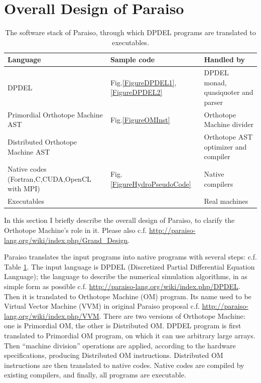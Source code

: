 \documentclass[twocolumn]{article}
\begin{document}
\section{Overall Design of Paraiso}
\label{SectionParaiso}

\begin{table}
  \begin{tabular}{|l|l|l|}
    \hline 
    Language                             &  Sample code & Handled by \\
    \hline 
    DPDEL                                & Fig.\ref{FigureDPDEL1},\ref{FigureDPDEL2} & DPDEL monad, quasiquoter and parser     \\
    Primordial Orthotope Machine AST     & Fig.\ref{FigureOMInst} & Orthotope Machine divider \\
    Distributed Orthotope Machine AST    & & Orthotope AST optimizer and compiler \\
    Native codes (Fortran,C,CUDA,OpenCL with MPI) & Fig.\ref{FigureHydroPseudoCode} & Native compilers\\
    Executables                          & & Real machines \\
    \hline
  \end{tabular}
  \caption{
    The software stack of Paraiso, through which DPDEL programs are translated to executables.
  }\label{TableSoftwareStack}
\end{table}

In this section I briefly describe the overall design of Paraiso, to clarify
the Orthotope Machine's role in it. Please also
c.f. \url{http://paraiso-lang.org/wiki/index.php/Grand_Design}.

Paraiso translates the input programs into native programs with several steps:
c.f. Table \ref{TableSoftwareStack}. The input language is DPDEL (Discretized
Partial Differential Equation Language); the language to describe the
numerical simulation algorithms, in as simple form as possible
c.f. \url{http://paraiso-lang.org/wiki/index.php/DPDEL}.  Then it is
translated to Orthotope Machine (OM) program. Its name used to be Virtual
Vector Machine (VVM) in original Paraiso proposal c.f.
\url{http://paraiso-lang.org/wiki/index.php/VVM}. There are two versions of
Orthotope Machine: one is Primordial OM, the other is Distributed OM.  DPDEL
program is first translated to Primordial OM program, on which it can use
arbitrary large arrays. Then ``machine division'' operations are applied,
according to the hardware specifications, producing Distributed OM
instructions. Distributed OM instructions are then translated to native
codes. Native codes are compiled by existing compilers, and finally, all
programs are executable.
\end{document}
